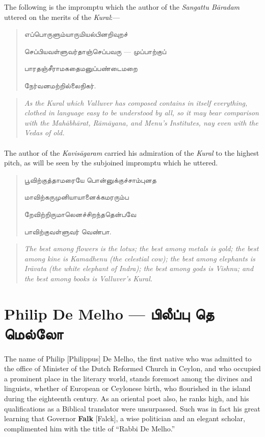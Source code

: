 \documentclass{article}
\newcommand{\TamilText}[1]{\texttamil{#1}}
\newcommand{\TamilBold}[1]{\texttamil{\textbf{#1}}}
\newcommand{\tam}[1]{\TamilText{#1}}
\newcommand{\tambold}[1]{\TamilBold{#1}}
\begin{document}
The following is the impromptu which the author of the \emph{Sangattu B\={a}radam} uttered on the merits of the \emph{Kural}:---
\begin{quotation}\small
\tam{எப்பொருளும்யாருமியல்பினறிவுறச்‌}

\tam{செப்பியவள்ளுவர்தாஞ்செப்பவரு} --- \tam{முப்பாற்குப்‌}

\tam{பாரதஞ்சீராமகதைமனுப்பண்டைமறை}

\tam{நேர்‌வனமற்றில்லைநிகர்‌}.
\end{quotation}
\begin{quotation}\small
\emph{As the Kural which Valluver has composed contains in itself everything, clothed in language easy to be understood by all, so it may bear comparison with the Mah\={a}bh\={a}rat, R\={a}m\={a}yana, and Menu's Institutes, nay even with the Vedas of old.}
\end{quotation}
\paragraph{}
The author of the \emph{Kavis\={a}garam} carried his admiration of the \emph{Kural} to the highest pitch, as will be seen by the subjoined impromptu which he uttered.
\begin{quotation}\small
\tam{பூவிற்குத்தாமரையே பொன்னுக்குச்சாம்புனத}

\tam{மாவிற்கருமுனியாயானைக்கமரரும்ப}

\tam{றேவிற்றிருமாலெனச்சிறந்ததென்பவே}

\tam{பாவிற்குவள்ளுவர்‌ வெண்பா}.
\end{quotation}
\begin{quotation}\small
\emph{The best among flowers is the lotus; the best among metals is gold; the best among kine is Kamadhenu (the celestial cow); the best among elephants is Ir\={a}vata (the white elephant of Indra); the best among gods is Vishnu; and the best among books is Valluver's Kural.}
\end{quotation}

\section{Philip De Melho --- \tambold{பிலீப்பு தெ மெல்லோ}}
\paragraph{}
The name of Philip [Philippus] De Melho, the first native who was admitted to the office of Minister of the Dutch Reformed Church in Ceylon, and who occupied a prominent place in the literary world, stands foremost among the divines and linguists, whether of European or Ceylonese birth, who flourished in the island during the eighteenth century. As an oriental poet also, he ranks high, and his qualifications as a Biblical translator were unsurpassed. Such was in fact his great learning that Governor \textbf{Falk} [Falck], a wise politician and an elegant scholar, complimented him with the title of ``Rabbi De Melho.''
\end{document}
